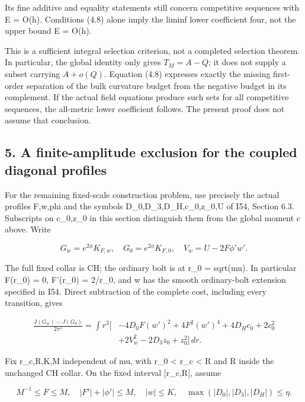 \documentclass[
  10pt,
]{article}
\begin{document}
Its fine additive and equality statements still concern competitive
sequences with E = O(h). Conditions (4.8) alone imply the liminf lower
coefficient four, not the upper bound E = O(h).

This is a sufficient integral selection criterion, not a completed
selection theorem. In particular, the global identity only gives
\(T_M=A-Q\); it does not supply a subset carrying \(A+o(Q)\). Equation
(4.8) expresses exactly the missing first-order separation of the bulk
curvature budget from the negative budget in its complement. If the
actual field equations produce such sets for all competitive sequences,
the all-metric lower coefficient follows. The present proof does not
assume that conclusion.

\hypertarget{a-finite-amplitude-exclusion-for-the-coupled-diagonal-profiles}{%
\subsection{5. A finite-amplitude exclusion for the coupled diagonal
profiles}\label{a-finite-amplitude-exclusion-for-the-coupled-diagonal-profiles}}

For the remaining fixed-scale construction problem, use precisely the
actual profiles F,w,phi and the symbols D\_0,D\_3,D\_H,c\_0,z\_0,U of
I54, Section 6.3. Subscripts on c\_0,z\_0 in this section distinguish
them from the global moment c above. Write

\[
 G_w=e^{2\phi}K_{F,w},\quad G_0=e^{2\phi}K_{F,0},
 \quad V_w=U-2F\phi'w'.
\]

The full fixed collar is CH; the ordinary bolt is at r\_0 = sqrt(mu). In
particular F(r\_0) = 0, F'(r\_0) = 2/r\_0, and w has the smooth
ordinary-bolt extension specified in I54. Direct subtraction of the
complete cost, including every transition, gives

\[
\begin{aligned}
 \frac{J(G_w)-J(G_0)}{2\pi^2}=\int r^3\bigl[
 &-4D_0F(w')^2+4F^2(w')^4+4D_Hc_0+2c_0^2\\
 &+2V_w^2-2D_3z_0+z_0^2\bigr]\,dr.                     
\end{aligned}\tag{5.1}
\]

Fix r\_c,R,K,M independent of mu, with r\_0 \textless{} r\_c \textless{}
R and R inside the unchanged CH collar. On the fixed interval
{[}r\_c,R{]}, assume

\[
 M^{-1}\le F\le M,\quad |F'|+|\phi'|\le M,\quad |w|\le K,\quad
                   \max(|D_0|,|D_3|,|D_H|)\le\eta.
                                                               \tag{5.2}
\]
\end{document}
